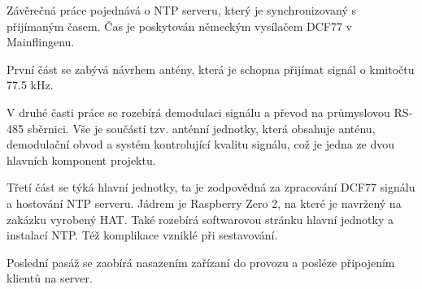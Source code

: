 Závěrečná práce pojednává o NTP serveru, který je synchronizovaný s přijímaným časem. Čas
je poskytován německým vysílačem DCF77 v Mainflingenu.

První část se zabývá návrhem antény, která je schopna přijímat signál o kmitočtu 77.5 kHz.

V druhé časti práce se rozebírá demodulaci signálu a převod na průmyslovou RS-485
sběrnici. Vše je součástí tzv. anténní jednotky, která obsahuje anténu, demodulační obvod a systém kontrolující kvalitu
signálu, což je jedna ze dvou hlavních komponent projektu.

Třetí část se týká hlavní jednotky, ta je zodpovědná za zpracování DCF77 signálu a
hostování NTP serveru. Jádrem je Raspberry Zero 2, na které je navržený na zakázku
vyrobený HAT. Také rozebírá softwarovou stránku hlavní jednotky a instalací NTP. Též
komplikace vzniklé při sestavování.

Poslední pasáž se zaobírá nasazením zařízaní
do provozu a posléze připojením klientů na server.
